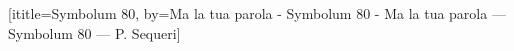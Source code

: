 




[ititle={Symbolum 80}, by={\ifacinquevert  Ma la tua parola - Symbolum 80 - \else Ma la tua parola — Symbolum 80 — \fi  P. Sequeri}] 	%
\ifchorded
\fi



\ifchorded
\vspace*{\versesep}
\vspace*{-\versesep}
\beginverse*



\nolyrics

